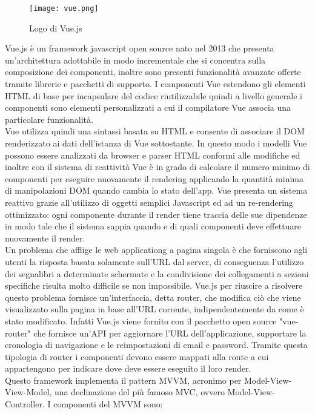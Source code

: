 \begin{figure}[H]
	\begin{center}
		\texttt{[image: vue.png]}
		\caption{Logo di Vue.js}
	\end{center}
\end{figure}
Vue.js è un framework javascript open source nato nel 2013 che presenta un'architettura adottabile in modo incrementale che si concentra sulla composizione dei componenti, inoltre sono presenti funzionalità avanzate offerte tramite librerie e pacchetti di supporto. I componenti Vue estendono gli elementi HTML di base per incapsulare del codice riutilizzabile quindi a livello generale i componenti sono elementi personalizzati a cui il compilatore Vue associa una particolare funzionalità.\\
Vue utilizza quindi una sintassi basata su HTML e consente di associare il DOM renderizzato ai dati dell'istanza di Vue sottostante. In questo modo i modelli Vue possono essere analizzati da browser e parser HTML conformi alle modifiche ed inoltre con il sistema di reattività Vue è in grado di calcolare il numero minimo di componenti per eseguire nuovamente il rendering applicando la quantità minima di manipolazioni DOM quando cambia lo stato dell'app. Vue presenta un sistema reattivo grazie all'utilizzo di oggetti semplici Javascript ed ad un re-rendering ottimizzato: ogni componente durante il render tiene traccia delle sue dipendenze in modo tale che il sistema sappia quando e di quali componenti deve effettuare nuovamente il render.\\
Un problema che afflige le \gls{web applicationg} a pagina singola è che forniscono agli utenti la risposta basata solamente sull'URL dal server, di conseguenza l'utilizzo dei segnalibri a determinate schermate e la condivisione dei collegamenti a sezioni specifiche risulta molto difficile se non impossibile. Vue.js per riuscire a risolvere questo problema fornisce un'interfaccia, detta router, che modifica ciò che viene visualizzato sulla pagina in base all'URL corrente, indipendentemente da come è stato modificato. Infatti Vue.js viene fornito con il pacchetto open source "vue-router" che fornisce un'API per aggiornare l'URL dell'applicazione, supportare la cronologia di navigazione e le reimpostazioni di email e password. Tramite questa tipologia di router i componenti devono essere mappati alla route a cui appartengono per indicare dove deve essere eseguito il loro render.\\
Questo framework implementa il pattern MVVM, acronimo per Model-View-View-Model, una declinazione del più famoso MVC, ovvero Model-View-Controller. I componenti del MVVM sono:
